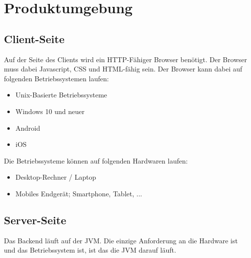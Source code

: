 \section{Produktumgebung}


\subsection{Client-Seite}
Auf der Seite des Clients wird ein HTTP-Fähiger Browser benötigt. Der Browser muss dabei Javascript, CSS und HTML-fähig sein. Der Browser kann dabei auf folgenden Betriebssystemen laufen:

\begin{itemize}
    \item Unix-Basierte Betriebssysteme
    \item Windows 10 und neuer
    \item Android
    \item iOS
\end{itemize}

Die Betriebssysteme können auf folgenden Hardwaren laufen:

\begin{itemize}
    \item Desktop-Rechner / Laptop 
    \item Mobiles Endgerät; Smartphone, Tablet, ...
\end{itemize}

    
\subsection{Server-Seite}
Das Backend läuft auf der JVM. Die einzige Anforderung an die Hardware ist und das Betriebssystem ist, ist das die JVM darauf läuft.